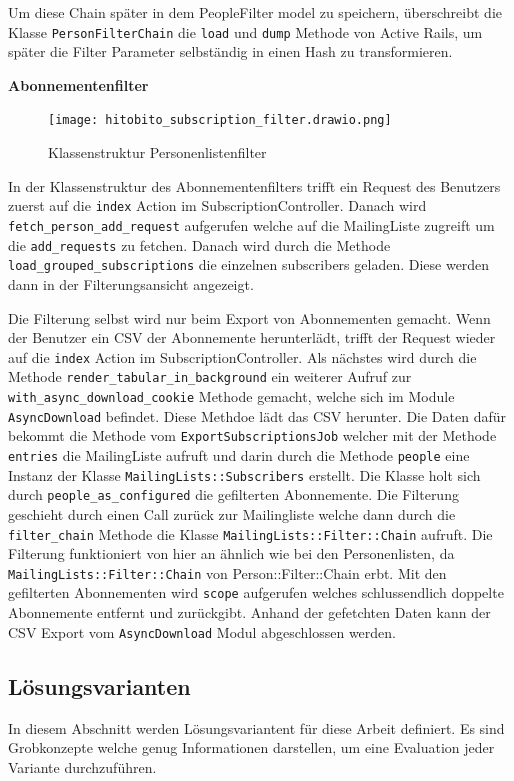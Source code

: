 Um diese Chain später in dem PeopleFilter model zu speichern, überschreibt die Klasse \texttt{Person\:\:Filter\:\:Chain} die \texttt{load} und \texttt{dump} Methode
von Active Rails, um später die Filter Parameter selbständig in einen Hash zu transformieren.

\newpage

\textbf{Abonnementenfilter}
\begin{figure}[h]
   \centering
   \texttt{[image: hitobito\_subscription\_filter.drawio.png]}
   \caption{Klassenstruktur Personenlistenfilter}
\end{figure}

In der Klassenstruktur des Abonnementenfilters trifft ein Request des Benutzers zuerst auf die \texttt{index} Action im SubscriptionController. 
Danach wird \texttt{fetch\_person\_add\_request} aufgerufen welche auf die MailingListe zugreift um die \texttt{add\_requests} zu fetchen. Danach wird durch
die Methode \texttt{load\_grouped\_subscriptions} die einzelnen subscribers geladen. Diese werden dann in der Filterungsansicht angezeigt. 

Die Filterung selbst wird nur beim Export von Abonnementen gemacht. Wenn der Benutzer ein CSV der Abonnemente herunterlädt, trifft der Request wieder auf die
\texttt{index} Action im SubscriptionController. Als nächstes wird durch die Methode \texttt{render\_tabular\_in\_background} ein weiterer Aufruf zur 
\texttt{with\_async\_download\_cookie} Methode gemacht, welche sich im Module \texttt{AsyncDownload} befindet. Diese Methdoe lädt das CSV herunter. 
Die Daten dafür bekommt die Methode vom \texttt{Export\:\:SubscriptionsJob} welcher mit der Methode \texttt{entries} die MailingListe aufruft und 
darin durch die Methode \texttt{people} eine Instanz der Klasse \texttt{MailingLists::Subscribers} erstellt. Die Klasse 
holt sich durch \texttt{people\_as\_configured} die gefilterten Abonnemente. Die Filterung geschieht durch einen Call zurück zur Mailingliste welche
dann durch die \texttt{filter\_chain} Methode die Klasse \texttt{MailingLists::Filter::Chain} aufruft. Die Filterung funktioniert von hier an ähnlich wie
bei den Personenlisten, da \texttt{MailingLists::Filter::Chain} von {Person::Filter::Chain} erbt. Mit den gefilterten Abonnementen wird \texttt{scope} aufgerufen
welches schlussendlich doppelte Abonnemente entfernt und zurückgibt. Anhand der gefetchten Daten kann der CSV Export vom \texttt{AsyncDownload} Modul abgeschlossen werden.

\subsection{Lösungsvarianten}
In diesem Abschnitt werden Lösungsvariantent für diese Arbeit definiert. Es sind Grobkonzepte welche genug Informationen darstellen, um eine
Evaluation jeder Variante durchzuführen.

